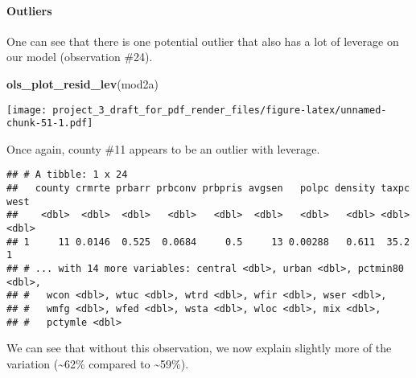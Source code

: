 \documentclass[]{article}
\newenvironment{Shaded}{\begin{snugshade}}{\end{snugshade}}
\newcommand{\DataTypeTok}[1]{\textcolor[rgb]{0.13,0.29,0.53}{#1}}
\newcommand{\DecValTok}[1]{\textcolor[rgb]{0.00,0.00,0.81}{#1}}
\newcommand{\KeywordTok}[1]{\textcolor[rgb]{0.13,0.29,0.53}{\textbf{#1}}}
\newcommand{\NormalTok}[1]{#1}
\newcommand{\OperatorTok}[1]{\textcolor[rgb]{0.81,0.36,0.00}{\textbf{#1}}}
\newcommand{\StringTok}[1]{\textcolor[rgb]{0.31,0.60,0.02}{#1}}
\let\oldparagraph\paragraph
\renewcommand{\paragraph}[1]{\oldparagraph{#1}\mbox{}}
\begin{document}
\hypertarget{outliers-1}{%
\paragraph{Outliers}\label{outliers-1}}

One can see that there is one potential outlier that also has a lot of
leverage on our model (observation \#24).

\begin{Shaded}
\begin{Highlighting}[]
\KeywordTok{ols_plot_resid_lev}\NormalTok{(mod2a)}
\end{Highlighting}
\end{Shaded}

\texttt{[image: project\_3\_draft\_for\_pdf\_render\_files/figure-latex/unnamed-chunk-51-1.pdf]}

Once again, county \#11 appears to be an outlier with leverage.

\begin{Shaded}
\end{Shaded}

\begin{verbatim}
## # A tibble: 1 x 24
##   county crmrte prbarr prbconv prbpris avgsen   polpc density taxpc  west
##    <dbl>  <dbl>  <dbl>   <dbl>   <dbl>  <dbl>   <dbl>   <dbl> <dbl> <dbl>
## 1     11 0.0146  0.525  0.0684     0.5     13 0.00288   0.611  35.2     1
## # ... with 14 more variables: central <dbl>, urban <dbl>, pctmin80 <dbl>,
## #   wcon <dbl>, wtuc <dbl>, wtrd <dbl>, wfir <dbl>, wser <dbl>,
## #   wmfg <dbl>, wfed <dbl>, wsta <dbl>, wloc <dbl>, mix <dbl>,
## #   pctymle <dbl>
\end{verbatim}

We can see that without this observation, we now explain slightly more
of the variation (\textasciitilde{}62\% compared to
\textasciitilde{}59\%).

\begin{Shaded}
\end{Shaded}
\end{document}
